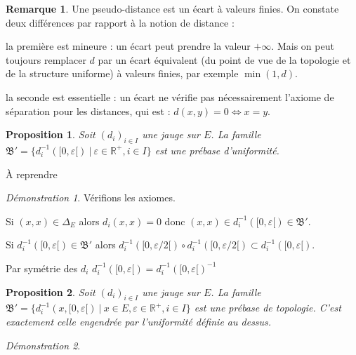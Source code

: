 \documentclass[a4paper, 11pt, french]{book}
\newenvironment{itemise}{\itemize}{\enditemize}
\let\colour=\color
\theoremstyle{plain} %
\newtheorem{proposition}{Proposition}
\theoremstyle{definition} %
\newtheorem{remarque}{Remarque}
\theoremstyle{remark} %
\newtheorem*{demonstration}{Démonstration}
\newcommand{\1}{\mathds{1}}
\newcommand{\inv}[1]{#1^{-1}}
\newcommand{\R}{\mathbb{R}}
\renewcommand{\frak}[1]{\mathfrak{#1}}
\newcommand\ens[2]{\{#1 \ |\ #2\}}
\begin{document}
\begin{remarque}
	Une pseudo-distance est un écart à valeurs finies.
	On constate deux différences par rapport à la notion de distance :
	\begin{itemise}
		\item la première est mineure : un écart peut prendre la valeur $+\infty$.
		Mais on peut toujours remplacer $d$ par un écart équivalent (du point de vue de la topologie et de la structure uniforme) à valeurs finies, par exemple $\min(1, d)$.
		\item la seconde est essentielle : un écart ne vérifie pas nécessairement l'axiome de séparation pour les distances, qui est : $d(x, y) = 0\iff x = y$.
	\end{itemise}
\end{remarque}

\begin{proposition}
	Soit $(d_i)_{i\in I}$ une jauge sur $E$.
	La famille $\frak{B}'=\ens{\inv{d_i}([0, \varepsilon[)}{\varepsilon\in\R^+, i\in I}$ est une prébase d'uniformité.
\end{proposition}

{\colour{red} À reprendre}

\begin{demonstration}
	Vérifions les axiomes.
	\begin{itemise}
		\item Si $(x, x)\in\Delta_E$ alors $d_i(x, x)=0$ donc $(x, x)\in\inv{d_i}([0, \varepsilon[)\in\frak{B}'$.
		\item Si $\inv{d_i}([0, \varepsilon[)\in\frak{B}'$ alors $\inv{d_i}([0, \varepsilon/2[)\circ \inv{d_i}([0, \varepsilon/2[)\subset\inv{d_i}([0, \varepsilon[)$.
		\item Par symétrie des $d_i$ $\inv{d_i}([0, \varepsilon[)=\inv{\inv{d_i}([0, \varepsilon[)}$
	\end{itemise}
\end{demonstration}

\begin{proposition}
	Soit $(d_i)_{i\in I}$ une jauge sur $E$.
	La famille $\frak{B}'=\ens{\inv{d_i}(x, [0, \varepsilon[)}{x\in E, \varepsilon\in\R^+, i\in I}$ est une prébase de topologie.
	C'est exactement celle engendrée par l'uniformité définie au dessus.
\end{proposition}

\begin{demonstration}
	\colour{red}{À démontrer}
\end{demonstration}
\end{document}
